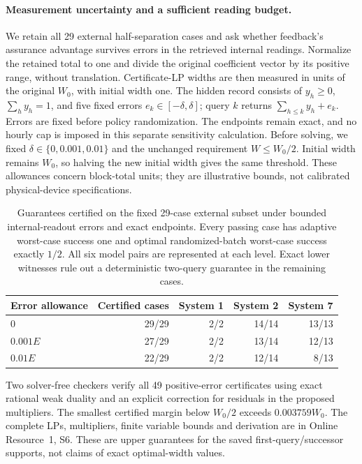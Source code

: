 \documentclass[12pt]{article}
\begin{document}
\paragraph{Measurement uncertainty and a sufficient reading budget.}\label{sec:stored-error-sensitivity}
We retain all 29 external half-separation cases and ask whether feedback's
assurance advantage survives errors in the retrieved internal readings.
Normalize the retained total to one and divide the original coefficient
vector by its positive range, without translation. Certificate-LP widths
are then measured in units of the original $W_0$, with initial width one.
The hidden record consists of
$y_h\geq0$, $\sum_h y_h=1$, and five fixed errors
$e_k\in[-\delta,\delta]$; query $k$ returns
$\sum_{h\leq k}y_h+e_k$. Errors are fixed before policy randomization.
The endpoints remain exact, and no hourly cap is imposed in this separate
sensitivity calculation. Before solving, we fixed
$\delta\in\{0,0.001,0.01\}$ and the unchanged requirement $W\leq W_0/2$.
Initial width remains $W_0$, so halving the new initial width gives the
same threshold. These allowances concern block-total units; they are
illustrative bounds, not calibrated physical-device specifications.

\begin{table}[htbp]\centering\small
\caption{Guarantees certified on the fixed 29-case external subset under
bounded internal-readout errors and exact endpoints. Every passing case
has adaptive worst-case success one and optimal randomized-batch worst-case
success exactly $1/2$. All six model pairs are represented at each level.
Exact lower witnesses rule out a deterministic two-query guarantee in the
remaining cases.}
\label{tab:stored-error-certificates}
\begin{tabular}{lrrrr}\toprule
Error allowance & Certified cases & System 1 & System 2 & System 7\\\midrule
$0$ & 29/29 & 2/2 & 14/14 & 13/13\\
$0.001E$ & 27/29 & 2/2 & 13/14 & 12/13\\
$0.01E$ & 22/29 & 2/2 & 12/14 & 8/13\\\bottomrule
\end{tabular}\end{table}

Two solver-free checkers verify all 49 positive-error certificates using
exact rational weak duality and an explicit correction for residuals in
the proposed multipliers. The smallest certified margin below $W_0/2$
exceeds $0.003759W_0$. The complete LPs, multipliers, finite variable bounds
and derivation are in Online Resource~1, S6. These are upper guarantees
for the saved first-query/successor supports, not claims of exact
optimal-width values.
\end{document}
